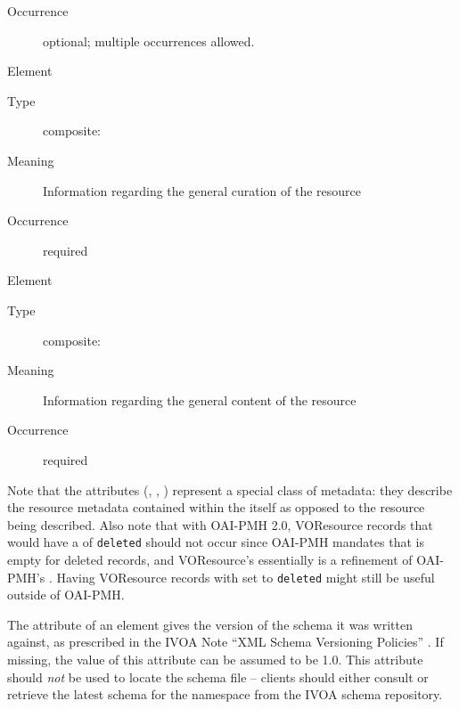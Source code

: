 \documentclass[11pt,a4paper]{ivoa}
\begin{document}
\begin{generated}
\begin{bigdescription}
\begin{description}
\item[Occurrence] optional; multiple occurrences allowed.

\end{description}
\item[Element \xmlel{curation}]
\begin{description}
\item[Type] composite: 
\item[Meaning]
               Information regarding the general curation of the resource

\item[Occurrence] required

\end{description}
\item[Element \xmlel{content}]
\begin{description}
\item[Type] composite: 
\item[Meaning]
               Information regarding the general content of the resource

\item[Occurrence] required

\end{description}


\end{bigdescription}\endgroup

\endgroup
\end{generated}


Note that the  attributes (,
, ) represent a special class of
metadata: they describe the resource metadata contained
within the  itself as opposed to the resource being
described.  Also note that with OAI-PMH 2.0, VOResource records that
would have a  of \verb|deleted| should not occur since
OAI-PMH mandates that  is empty for deleted
records, and VOResource's  essentially is a refinement of
OAI-PMH's .  Having VOResource records with 
set to \verb|deleted| might still be useful outside of OAI-PMH.

The  attribute of an  element gives
the version of the schema it was written against, as prescribed in the
IVOA Note ``XML Schema Versioning Policies''
\citep{2018ivoa.spec.0529H}.  If missing, the value of this attribute
can be assumed to be 1.0.  This attribute should \emph{not} be used to
locate the schema file -- clients should either consult
 or retrieve the latest schema for the 
namespace from the IVOA schema repository.
\end{document}
